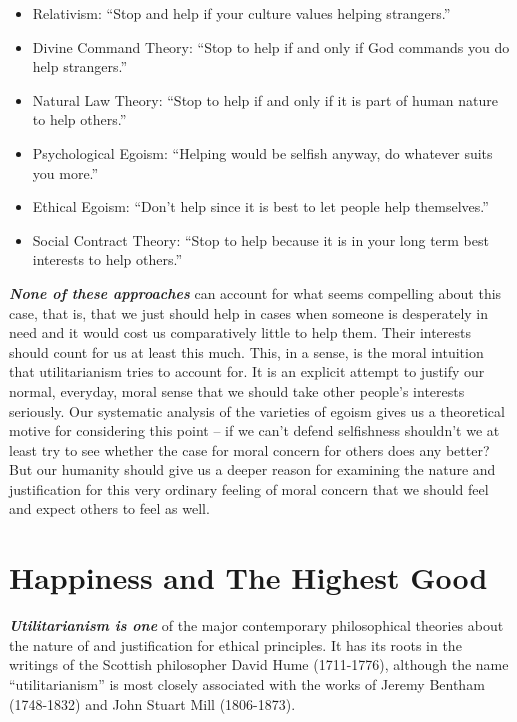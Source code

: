 \documentclass[
  12pt, openany]{book}
\providecommand{\tightlist}{%
  \setlength{\itemsep}{0pt}\setlength{\parskip}{0pt}}
\theoremstyle{definition}
\theoremstyle{definition}
\theoremstyle{definition}
\theoremstyle{definition}
\theoremstyle{remark}
\begin{document}
\begin{itemize}
\tightlist
\item
  Relativism: ``Stop and help if your culture values helping strangers.''
\item
  Divine Command Theory: ``Stop to help if and only if God commands you do help strangers.''
\item
  Natural Law Theory: ``Stop to help if and only if it is part of human nature to help others.''
\item
  Psychological Egoism: ``Helping would be selfish anyway, do whatever suits you more.''
\item
  Ethical Egoism: ``Don't help since it is best to let people help themselves.''
\item
  Social Contract Theory: ``Stop to help because it is in your long term best interests to help others.''
\end{itemize}

\textbf{\emph{None of these approaches}} can account for what seems compelling about this case, that is, that we just should help in cases when someone is desperately in need and it would cost us comparatively little to help them. Their interests should count for us at least this much. This, in a sense, is the moral intuition that utilitarianism tries to account for. It is an explicit attempt to justify our normal, everyday, moral sense that we should take other people's interests seriously. Our systematic analysis of the varieties of egoism gives us a theoretical motive for considering this point -- if we can't defend selfishness shouldn't we at least try to see whether the case for moral concern for others does any better? But our humanity should give us a deeper reason for examining the nature and justification for this very ordinary feeling of moral concern that we should feel and expect others to feel as well.

\hypertarget{happiness-and-the-highest-good}{%
\section{Happiness and The Highest Good}\label{happiness-and-the-highest-good}}

\textbf{\emph{Utilitarianism is one}} of the major contemporary philosophical theories about the nature of and justification for ethical principles. It has its roots in the writings of the Scottish philosopher David Hume (1711-1776), although the name ``utilitarianism'' is most closely associated with the works of Jeremy Bentham (1748-1832) and John Stuart Mill (1806-1873).
\end{document}
